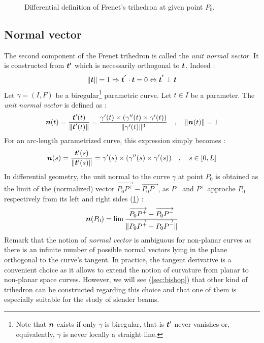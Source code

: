 \begin{figure}[t]
     \centering
     \caption{Differential definition of Frenet's trihedron at given point $P_0$.}
     \label{fig:3_1}
\end{figure}

\subsection{Normal vector}
The second component of the Frenet trihedron is called the \emph{unit normal vector}. It is constructed from $\boldsymbol{t'}$ which is necessarily orthogonal to $\boldsymbol{t}$. Indeed :
\begin{equation}
	\lVert\boldsymbol{t}\rVert=1 \Rightarrow \boldsymbol{t^{'}} \cdot  \boldsymbol{t} = 0 \Leftrightarrow  \boldsymbol{t^{'}} \perp \boldsymbol{t}
\end{equation}
Let $\gamma = (I,F)$ be a biregular\footnote{
Note that $\boldsymbol{n}$ exists if only $\gamma$ is biregular, that is $\boldsymbol{t}'$ never vanishes or, equivalently, $\gamma$ is never locally a straight line.} parametric curve. 
Let $t \in I$ be a parameter. The \emph{unit normal vector} is defined as :
\begin{equation}
	\boldsymbol{n}(t) = \frac{\boldsymbol{t}'(t)}{\lVert\boldsymbol{t}'(t)\rVert} 
	= \frac{\gamma'(t) \times (\gamma''(t) \times \gamma'(t))}{\lVert\gamma'(t)\rVert^3}
	\quad,\quad
	\lVert\boldsymbol{n}(t)\rVert=1
\end{equation}
For an arc-length parametrized curve, this expression simply becomes :
\begin{equation}
	\boldsymbol{n}(s) = \frac{\boldsymbol{t}'(s)}{\lVert\boldsymbol{t}'(s)\rVert} 
	= \gamma'(s) \times (\gamma''(s) \times \gamma'(s))
	\quad,\quad
	s \in [0,L]
\end{equation}
In differential geometry, the unit normal to the curve $\gamma$ at point $P_0$ is obtained as the limit of the (normalized) vector $\overrightarrow{P_0 P^+}-\overrightarrow{P_0 P^-}$, as $P^-$ and $P^+$ approche $P_0$ respectively from its left and right sides (\cref{fig:3_1}) :
\begin{equation}
	\boldsymbol{n}(P_0)
	= \lim_{}\frac{\overrightarrow{P_0 P^+}-\overrightarrow{P_0 P^-}}{\lVert\overrightarrow{P_0 P^+}-\overrightarrow{P_0 P^-}\rVert}
\label{eq:3_4}
\end{equation}
Remark that the notion of \emph{normal vector} is ambiguous for non-planar curves as there is an infinite number of possible normal vectors lying in the plane orthogonal to the curve's tangent. In practice, the tangent derivative is a convenient choice as it allows to extend the notion of curvature from planar to non-planar space curves. However, we will see (\cref{sec:bishop}) that other kind of trihedron can be constructed regarding this choice and that one of them is especially suitable for the study of slender beams.

